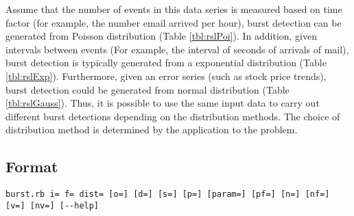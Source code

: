 \begin{table}[htbp]
\begin{center}
\begin{tabular}{llll}
\end{tabular} 
\end{center}
\end{table} 

Assume that the number of events in this data series is measured based on time factor (for example, the number email arrived per hour), burst detection can be generated from  Poisson distribution (Table \ref{tbl:rslPoi}).
In addition, given intervals between events (For example, the interval of seconds of arrivals of mail), burst detection is typically generated from a exponential distribution (Table \ref{tbl:rslExp}).
Furthermore, given an error series (such as stock price trends), burst detection could be generated from normal distribution (Table \ref{tbl:rslGauss}).
Thus, it is possible to use the same input data to carry out different burst detections depending on the distribution methods. The choice of distribution method is determined by the application to the problem.

\subsection*{Format}
\begin{verbatim}
burst.rb i= f= dist= [o=] [d=] [s=] [p=] [param=] [pf=] [n=] [nf=] [v=] [nv=] [--help]
\end{verbatim}

